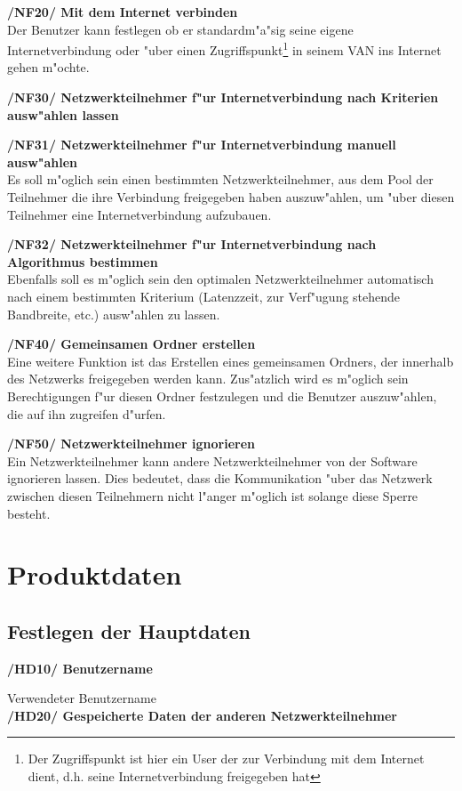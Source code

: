 \documentclass[a4paper,12pt]{scrreprt}
\begin{document}
			\textbf {/NF20/ Mit dem Internet verbinden} 
			\\Der Benutzer kann festlegen ob er standardm"a"sig seine eigene Internetverbindung oder "uber einen Zugriffspunkt\footnote{Der Zugriffspunkt ist hier ein User der zur Verbindung mit dem Internet dient, d.h. seine Internetverbindung freigegeben hat} in seinem VAN ins Internet gehen m"ochte.
			
			\textbf {/NF30/ Netzwerkteilnehmer f"ur Internetverbindung nach Kriterien ausw"ahlen lassen}
			
			\textbf {/NF31/ Netzwerkteilnehmer f"ur Internetverbindung manuell ausw"ahlen}
			\\Es soll m"oglich sein einen bestimmten Netzwerkteilnehmer, aus dem Pool der Teilnehmer die ihre Verbindung freigegeben haben auszuw"ahlen, um "uber diesen Teilnehmer eine Internetverbindung aufzubauen.
			
			\textbf {/NF32/ Netzwerkteilnehmer f"ur Internetverbindung nach Algorithmus bestimmen}
			\\Ebenfalls soll es m"oglich sein den optimalen Netzwerkteilnehmer automatisch nach einem bestimmten Kriterium (Latenzzeit, zur Verf"ugung stehende Bandbreite, etc.) ausw"ahlen zu lassen.
			
			\textbf {/NF40/ Gemeinsamen Ordner erstellen}
			\\Eine weitere Funktion ist das Erstellen eines gemeinsamen Ordners, der innerhalb des Netzwerks freigegeben werden kann. Zus"atzlich wird es m"oglich sein Berechtigungen f"ur diesen Ordner festzulegen und die Benutzer auszuw"ahlen, die auf ihn zugreifen d"urfen.
			
			\textbf {/NF50/ Netzwerkteilnehmer ignorieren}
			\\Ein Netzwerkteilnehmer kann andere Netzwerkteilnehmer von der Software ignorieren lassen. Dies bedeutet, dass die Kommunikation "uber das Netzwerk zwischen diesen Teilnehmern nicht l"anger m"oglich ist solange diese Sperre besteht.
		
\chapter{Produktdaten}
	
	\section{Festlegen der Hauptdaten}
				\textbf {/HD10/ Benutzername}
				
				Verwendeter Benutzername\\
				\textbf {/HD20/ Gespeicherte Daten der anderen Netzwerkteilnehmer}
				
\end{document}
